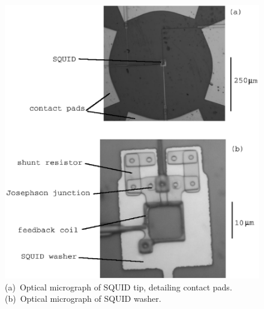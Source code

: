 %
%

%
%
\begin{figure}[p]
\includegraphics[width=5.7in]{figs/appendixA/squidimages.ps}
\caption[Optical micrograph of SQUID chip and washer]
{(a)~Optical micrograph of SQUID tip, detailing contact pads.
(b)~Optical micrograph of SQUID washer. }
\label{fig:SQUID_optical_close}
\label{fig:SQUID_optical_large}
\end{figure}

% 
%

